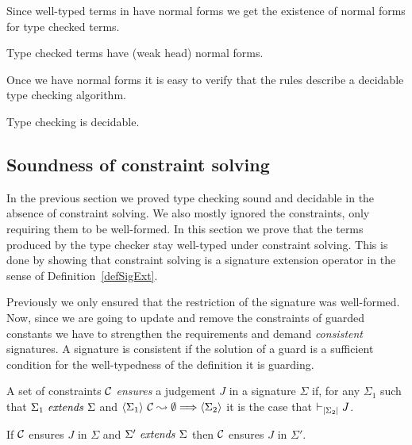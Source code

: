 Since well-typed terms in {\Core} have normal forms we get the existence of
normal forms for type checked terms.

\begin{corollary}
    Type checked terms have (weak head) normal forms.
\end{corollary}

Once we have normal forms it is easy to verify that the rules describe a
decidable type checking algorithm.

\begin{corollary}
    Type checking is decidable.
\end{corollary}

\subsection{Soundness of constraint solving}

In the previous section we proved type checking sound and decidable in the
absence of constraint solving. We also mostly ignored the constraints, only
requiring them to be well-formed. In this section we prove that the terms
produced by the type checker stay well-typed under constraint solving. This is
done by showing that constraint solving is a signature extension operator in
the sense of Definition~\ref{defSigExt}.

Previously we only ensured that the {\Core} restriction of the signature was
well-formed. Now, since we are going to update and remove the constraints of
guarded constants we have to strengthen the requirements and demand {\em
consistent} signatures. A signature is consistent if the solution of a guard is
a sufficient condition for the well-typedness of the definition it is guarding.

\begin{definition}[Ensures] \label{defEnsures}
    A set of constraints $\mathcal{C}$ {\em ensures} a {\Core} judgement $J$ in a signature
    $\Sigma$ if, for any $\Sigma_1$ such that
    ${\Sigma_1} ~ \mathit{extends} ~ {\Sigma}$ and
    $\langle {\Sigma_1} \rangle ~ {{\mathcal{C}} \leadsto {\emptyset}} \Longrightarrow \langle {\Sigma_2} \rangle$
    it is the case that $\vdash_{\left|{\Sigma_2}\right|} J$.
\end{definition}

\begin{remark} \label{lemExtendEnsures}
    If $\mathcal{C}$ ensures $J$ in $\Sigma$ and ${\Sigma'} ~ \mathit{extends} ~ {\Sigma}$ then $\mathcal{C}$
    ensures $J$ in $\Sigma'$.
\end{remark}

